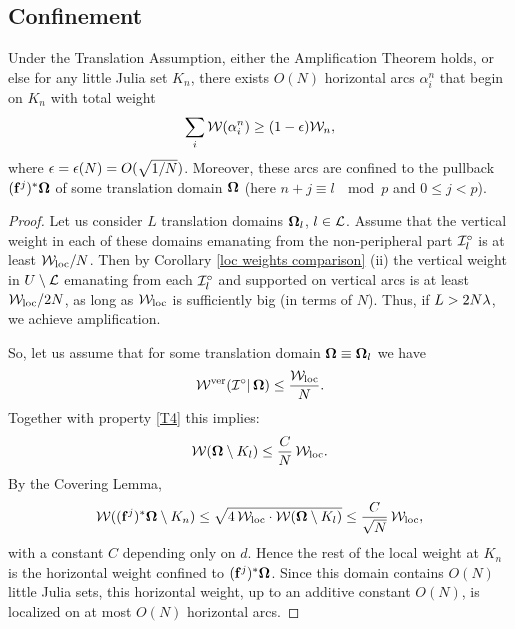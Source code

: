 \subsection{Confinement}


\begin{lem}\label{localization of local weight}
  Under the Translation Assumption, either the Amplification Theorem holds, or else 
  for any little Julia set $K_n$, there exists  $O(N)$  horizontal arcs $\alpha^n_i$ that begin on $K_n$ 
with total weight
$$
    \sum_i {\mathcal W}(\alpha^n_i) \geq (1-{\epsilon}) {\mathcal W}_n, 
$$
where ${\epsilon}={\epsilon}(N)= O(\sqrt{1/N})$. Moreover, these arcs are confined to the pullback $({\mathbf{f}}^j)^* {\boldsymbol{{\Omega}}}$
of some translation domain ${\boldsymbol{{\Omega}}}$
(here $n+j\equiv l \ \mod p$ and $0\leq j< p$). 
\end{lem}

\begin{proof}
Let us consider $L$ translation domains ${\boldsymbol{{\Omega}}}_l$, $l\in {\mathcal L}$. Assume that the vertical weight in each of these domains
emanating from the non-peripheral part ${\mathcal I}_l^\circ$ is at least ${\mathcal W}_{\mathrm{loc}}/N$.
Then by  Corollary \ref{loc weights comparison} (ii)  %
the vertical weight in 
$U\setminus {\mathcal L}$ emanating from each ${\mathcal I}_l^\circ$ and supported on vertical
arcs is at least $ {\mathcal W}_{\mathrm{loc}}/ {2N}$, 
as long as ${\mathcal W}_{\mathrm{loc}}$ is sufficiently big (in terms of $N$). 
Thus, if $L > 2 N {\lambda}$, we achieve amplification. 


So, let us assume that for some translation domain ${\boldsymbol{{\Omega}}}\equiv {\boldsymbol{{\Omega}}}_l$ we have
$$
  {\mathcal W}^{\mathrm {ver}}({\mathcal I}^\circ|\, {\boldsymbol{{\Omega}}}) \leq \frac  {{\mathcal W}_{\mathrm{loc}}}N.  
$$
Together with property \ref{T4} this implies:  
$$
   {\mathcal W}({\boldsymbol{{\Omega}}}\setminus K_l) \leq \frac CN \, {\mathcal W}_{\mathrm{loc}}. 
$$
By the Covering Lemma,
$$
     {\mathcal W}( ({\mathbf{f}}^j)^* {\boldsymbol{{\Omega}}}  \setminus K_n ) \leq  \sqrt{4\,  {\mathcal W}_{\mathrm{loc}} \cdot
       {\mathcal W}({\boldsymbol{{\Omega}}}\setminus K_l )} \leq \frac C {\sqrt{N}}\,  {\mathcal W}_{\mathrm{loc}}, 
$$
with a constant $C$ depending only on $d$.
Hence the rest of the local weight at $K_n$ is the horizontal weight confined to  $({\mathbf{f}}^j)^* {\boldsymbol{{\Omega}}}$. Since this domain contains 
$O(N)$ little Julia sets, this horizontal weight, up to an additive constant $O(N)$,  is localized on at most $O(N)$ horizontal arcs.
\end{proof}


